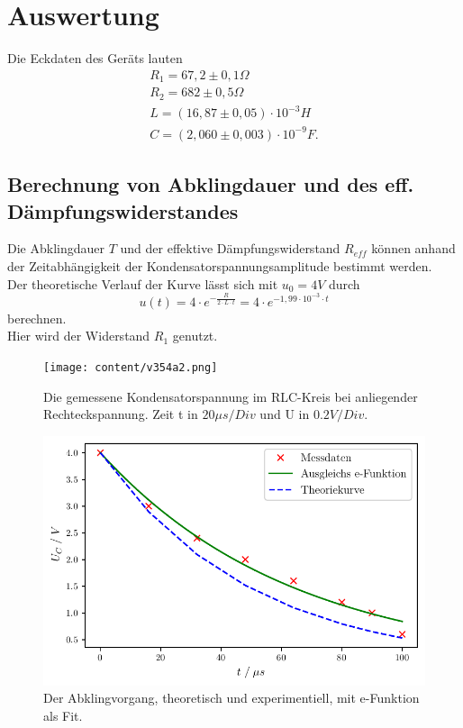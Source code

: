 \section{Auswertung}
\label{sec:Auswertung}

Die Eckdaten des Geräts lauten 
\begin{align*}
  R_1 = 67,2 \pm 0,1 \Omega \\
  R_2 = 682 \pm 0,5 \Omega \\
  L = (16,87 \pm 0,05) \cdot 10^{-3}H \\
  C = (2,060 \pm 0,003) \cdot 10^{-9}F.   %
\end{align*}






\subsection{Berechnung von Abklingdauer und des eff. Dämpfungswiderstandes}
\label{Abklingdauer und R_daempf}

Die Abklingdauer $T$ und der effektive Dämpfungswiderstand $R_{eff}$ können anhand der Zeitabhängigkeit der Kondensatorspannungsamplitude 
bestimmt werden.\\

Der theoretische Verlauf der Kurve lässt sich mit $u_0 = 4V$ durch 
\begin{equation*}
    u(t) = 4 \cdot e^{-\frac{R}{2 \cdot L \cdot t}} = 4 \cdot e^{- 1,99 \cdot 10^{-3} \cdot t}
\end{equation*}
berechnen.\\
Hier wird der Widerstand $R_1$ genutzt. 

\begin{figure}[H]
  \centering
  \texttt{[image: content/v354a2.png]}
  \caption{Die gemessene Kondensatorspannung im RLC-Kreis bei anliegender Rechteckspannung. Zeit t in $20\mu s/Div$ und U in $0.2V/Div$.}
  \label{fig:MessApp}
\end{figure}



\begin{figure}
  \centering
  \includegraphics{build/plot_Tex.pdf}
  \caption{Der Abklingvorgang, theoretisch und experimentiell, mit e-Funktion als Fit.}
  \label{fig:plot_abklingdauer}
\end{figure}

